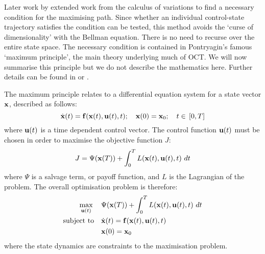 Later work by \citet{pontryagin_mathematical_1962} extended work from the calculus of variations to find a necessary condition for the maximising path. Since whether an individual control-state trajectory satisfies the condition can be tested, this method avoids the `curse of dimensionality' with the Bellman equation. There is no need to recurse over the entire state space. The necessary condition is contained in Pontryagin's famous `maximum principle', the main theory underlying much of OCT. We will now summarise this principle but we do not describe the mathematics here. Further details can be found in \citet{lenhart_optimal_2007} or \citet{hocking_optimal_1991}.

The maximum principle relates to a differential equation system for a state vector $\mathbf{\bm{x}}$, described as follows:
\begin{equation}\label{eqn:ch2:state_system}
    \dot{\mathbf{\bm{x}}}(t) = \mathbf{\bm{f}}(\mathbf{\bm{x}}(t), \mathbf{\bm{u}}(t), t);\quad{}\mathbf{\bm{x}}(0)=\mathbf{\bm{x}}_0;\quad{}t\in{}\left[0, T\right]
\end{equation}
where $\mathbf{\bm{u}}(t)$ is a time dependent control vector. The control function $\mathbf{\bm{u}}(t)$ must be chosen in order to maximise the objective function $J$:
\begin{equation}\label{eqn:ch2:objective}
    J = \Psi{}(\mathbf{\bm{x}}(T)) + \int_0^TL(\mathbf{\bm{x}}(t), \mathbf{\bm{u}}(t), t)\,\mathop{dt}
\end{equation}
where $\Psi$ is a salvage term, or payoff function, and $L$ is the Lagrangian of the problem. The overall optimisation problem is therefore:
\begin{subequations}\label{eqn:ch2:opt_problem}
    \begin{align}
        \max_{\vect{u}(t)} \quad{} &\null \Psi{}(\vect{x}(T)) + \int_0^TL(\vect{x}(t), \vect{u}(t), t)\,\mathop{dt} \label{eqn:ch2:opt_problem_a}\\
        \text{subject to} \quad{} &\null \dot{\vect{x}}(t) = \vect{f}(\vect{x}(t), \vect{u}(t), t) \label{eqn:ch2:opt_problem_b}\\
        &\null \vect{x}(0)=\vect{x}_0 \label{eqn:ch2:opt_problem_c}
    \end{align}
\end{subequations}
where the state dynamics are constraints to the maximisation problem.

